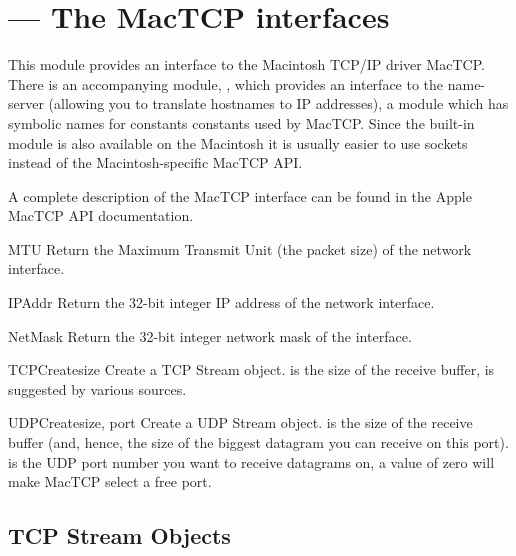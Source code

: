 \section{ ---
         The MacTCP interfaces}



This module provides an interface to the Macintosh TCP/IP driver%
 MacTCP. There is an accompanying module,
, which provides an interface
to the name-server (allowing you to translate hostnames to IP
addresses), a module 
which has symbolic names for constants constants used by MacTCP. Since
the built-in module  is also
available on the Macintosh it is usually easier to use sockets instead
of the Macintosh-specific MacTCP API.

A complete description of the MacTCP interface can be found in the
Apple MacTCP API documentation.

\begin{funcdesc}{MTU}{}
Return the Maximum Transmit Unit (the packet size) of the network
interface.
\end{funcdesc}

\begin{funcdesc}{IPAddr}{}
Return the 32-bit integer IP address of the network interface.
\end{funcdesc}

\begin{funcdesc}{NetMask}{}
Return the 32-bit integer network mask of the interface.
\end{funcdesc}

\begin{funcdesc}{TCPCreate}{size}
Create a TCP Stream object.  is the size of the receive
buffer,  is suggested by various sources.
\end{funcdesc}

\begin{funcdesc}{UDPCreate}{size, port}
Create a UDP Stream object.  is the size of the receive
buffer (and, hence, the size of the biggest datagram you can receive
on this port).  is the UDP port number you want to receive
datagrams on, a value of zero will make MacTCP select a free port.
\end{funcdesc}


\subsection{TCP Stream Objects}

